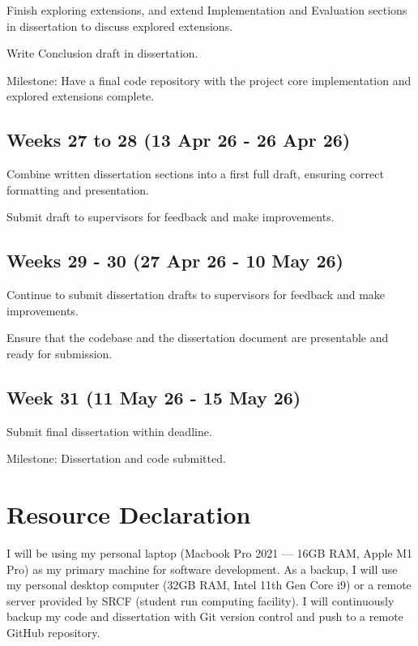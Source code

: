 \begin{refsection}
  Finish exploring extensions, and extend Implementation and Evaluation sections in dissertation to discuss explored extensions.

  Write Conclusion draft in dissertation.

  Milestone: Have a final code repository with the project core implementation and explored extensions complete.

  \subsection*{Weeks 27 to 28 (13 Apr 26 - 26 Apr 26)}

  Combine written dissertation sections into a first full draft, ensuring correct formatting and presentation.

  Submit draft to supervisors for feedback and make improvements.

  \subsection*{Weeks 29 - 30 (27 Apr 26 - 10 May 26)}

  Continue to submit dissertation drafts to supervisors for feedback and make improvements.

  Ensure that the codebase and the dissertation document are presentable and ready for submission.

  \subsection*{Week 31 (11 May 26 - 15 May 26)}

  Submit final dissertation within deadline.

  Milestone: Dissertation and code submitted.

  \section{Resource Declaration}

  I will be using my personal laptop (Macbook Pro 2021 --- 16GB RAM, Apple M1 Pro) as my primary machine for software development. As a backup, I will use my personal desktop computer (32GB RAM, Intel 11th Gen Core i9) or a remote server provided by SRCF (student run computing facility). I will continuously backup my code and dissertation with Git version control and push to a remote GitHub repository.


  \newpage

  \printbibliography[heading=subbibliography]
\end{refsection}